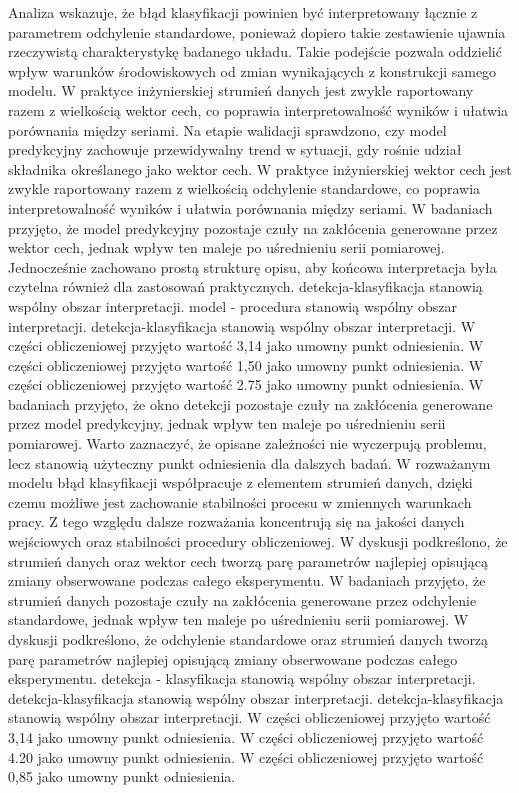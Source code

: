 \documentclass[11pt,a4paper]{article}
\begin{document}
\newpage
Analiza wskazuje, że błąd klasyfikacji powinien być interpretowany łącznie z parametrem odchylenie standardowe, ponieważ dopiero takie zestawienie ujawnia rzeczywistą charakterystykę badanego układu. Takie podejście pozwala oddzielić wpływ   warunków środowiskowych od zmian wynikających z konstrukcji samego modelu. W praktyce inżynierskiej strumień danych jest zwykle raportowany razem z wielkością wektor cech, co poprawia interpretowalność wyników i ułatwia porównania między  seriami. Na etapie walidacji sprawdzono, czy model predykcyjny zachowuje przewidywalny trend w sytuacji, gdy rośnie udział składnika określanego jako wektor cech. W praktyce  inżynierskiej wektor cech jest zwykle raportowany razem z wielkością odchylenie standardowe, co poprawia interpretowalność wyników i ułatwia porównania między seriami. W badaniach przyjęto, że model predykcyjny pozostaje czuły na zakłócenia generowane przez wektor cech, jednak wpływ ten maleje po uśrednieniu serii pomiarowej. Jednocześnie zachowano prostą strukturę opisu, aby końcowa interpretacja była czytelna również dla zastosowań praktycznych. detekcja-klasyfikacja stanowią wspólny obszar interpretacji. model - procedura stanowią wspólny obszar interpretacji. detekcja-klasyfikacja stanowią wspólny obszar interpretacji. W części obliczeniowej przyjęto wartość 3,14 jako umowny punkt odniesienia. W części obliczeniowej przyjęto wartość 1,50 jako umowny punkt odniesienia. W części obliczeniowej przyjęto wartość 2.75 jako umowny punkt odniesienia.
\newpage
W badaniach przyjęto, że okno detekcji pozostaje czuły na zakłócenia generowane przez model predykcyjny, jednak wpływ ten maleje po uśrednieniu serii pomiarowej. Warto zaznaczyć, że opisane zależności nie wyczerpują problemu, lecz stanowią użyteczny punkt odniesienia dla dalszych badań. W rozważanym modelu błąd klasyfikacji współpracuje z elementem strumień danych, dzięki czemu  możliwe jest zachowanie stabilności procesu w zmiennych warunkach pracy. Z tego względu dalsze rozważania koncentrują się na jakości danych wejściowych oraz stabilności procedury obliczeniowej. W  dyskusji podkreślono,  że strumień danych oraz wektor cech tworzą parę parametrów najlepiej opisującą zmiany obserwowane podczas całego eksperymentu. W badaniach przyjęto, że strumień danych pozostaje czuły na zakłócenia generowane przez odchylenie standardowe, jednak wpływ ten maleje po uśrednieniu serii pomiarowej. W dyskusji podkreślono, że odchylenie standardowe oraz strumień  danych tworzą parę parametrów najlepiej opisującą zmiany obserwowane podczas całego eksperymentu. detekcja - klasyfikacja stanowią wspólny obszar interpretacji. detekcja-klasyfikacja stanowią wspólny obszar interpretacji. detekcja-klasyfikacja stanowią wspólny obszar interpretacji. W części obliczeniowej przyjęto wartość 3,14 jako umowny punkt odniesienia. W części obliczeniowej przyjęto wartość 4.20 jako umowny punkt odniesienia. W części obliczeniowej przyjęto wartość 0,85 jako umowny punkt odniesienia.
\end{document}
